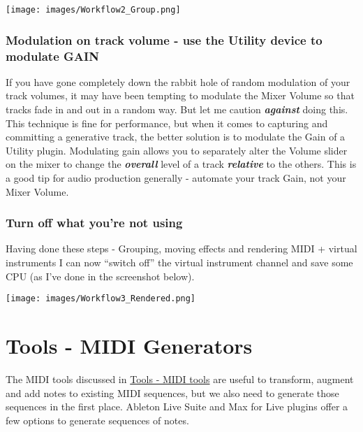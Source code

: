 \documentclass[
  12pt,
  letterpaper,
  oneside,
  open=any]{scrbook}
\begin{document}
\texttt{[image: images/Workflow2\_Group.png]}

\subsection{Modulation on track volume - use the Utility device to
modulate
GAIN}\label{modulation-on-track-volume---use-the-utility-device-to-modulate-gain}

If you have gone completely down the rabbit hole of random modulation of
your track volumes, it may have been tempting to modulate the Mixer
Volume so that tracks fade in and out in a random way. But let me
caution \textbf{\emph{against}} doing this. This technique is fine for
performance, but when it comes to capturing and committing a generative
track, the better solution is to modulate the Gain of a Utility plugin.
Modulating gain allows you to separately alter the Volume slider on the
mixer to change the \textbf{\emph{overall}} level of a track
\textbf{\emph{relative}} to the others. This is a good tip for audio
production generally - automate your track Gain, not your Mixer Volume.

\subsection{Turn off what you're not
using}\label{turn-off-what-youre-not-using}

Having done these steps - Grouping, moving effects and rendering MIDI +
virtual instruments I can now ``switch off'' the virtual instrument
channel and save some CPU (as I've done in the screenshot below).

\texttt{[image: images/Workflow3\_Rendered.png]}


\chapter{Tools - MIDI
Generators}\label{Chapter-012-Tools-MIDI_Generators}

The MIDI tools discussed in
\hyperref[Chapter-004-Tools-MIDI_tools]{Tools - MIDI tools} are useful
to transform, augment and add notes to existing MIDI sequences, but we
also need to generate those sequences in the first place. Ableton Live
Suite and Max for Live plugins offer a few options to generate sequences
of notes.
\end{document}
